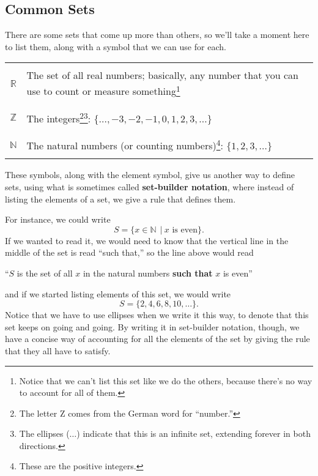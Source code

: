 \subsection{Common Sets}

There are some sets that come up more than others, so we'll take a moment here to list them, along with a symbol that we can use for each.
\begin{center}
\begin{tabularx}{3.5in}{|c | X|}
\hline
& \\
$\mathbb{R}$ & The set of all real numbers; basically, any number that you can use to count or measure something\footnote{Notice that we can't list this set like we do the others, because there's no way to account for all of them.}\\
& \\
\hline
& \\
$\mathbb{Z}$ & The integers\footnote{The letter Z comes from the German word for ``number.''}\footnote{The ellipses ($\ldots$) indicate that this is an infinite set, extending forever in both directions.}: $\{\ldots, -3,-2,-1,0,1,2,3, \ldots\}$\\
& \\
\hline
& \\
$\mathbb{N}$ & The natural numbers (or counting numbers)\footnote{These are the positive integers.}: $\{1,2,3,\ldots\}$\\
& \\
\hline
\end{tabularx}
\end{center}

These symbols, along with the element symbol, give us another way to define sets, using what is sometimes called \textbf{set-builder notation}, where instead of listing the elements of a set, we give a rule that defines them.

For instance, we could write \[S = \{x \in \mathbb{N}\ \ |\ x \textrm{ is even}\}.\]  If we wanted to read it, we would need to know that the vertical line in the middle of the set is read ``such that,'' so the line above would read 
\begin{center}
``$S$ is the set of all $x$ in the natural numbers \textbf{such that} $x$ is even''
\end{center}
and if we started listing elements of this set, we would write \[S = \{2, 4, 6, 8, 10, \ldots\}.\]  Notice that we have to use ellipses when we write it this way, to denote that this set keeps on going and going.  By writing it in set-builder notation, though, we have a concise way of accounting for all the elements of the set by giving the rule that they all have to satisfy.
\pagebreak
\text{}
\vfill

